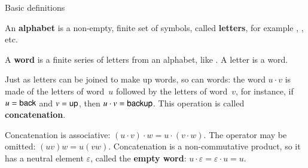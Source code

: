 
%
\begin{frame}{Basic definitions}

An \textbf{alphabet} is a non\hyp{}empty, finite set of symbols, called
\textbf{letters}, for example , ,  etc.

\bigskip

A \textbf{word} is a finite series of letters from an alphabet, like
. A letter is a word.

\bigskip

Just as letters can be joined to make up words, so can words: the word
\(u \cdot v\) is made of the letters of word~\(u\) followed by the
letters of word~\(v\), for instance, if \(u=\textsf{back}\) and
\(v=\textsf{up}\), then \(u \cdot v = \textsf{backup}\). This operation is
called \textbf{concatenation}.

\bigskip

Concatenation is associative: \((u \cdot v) \cdot w = u \cdot (v \cdot
w)\). The operator may be omitted: \((uv)w = u(vw)\). Concatenation is
a non\hyp{}commutative product, so it has a neutral element
\(\varepsilon\), called the \textbf{empty word}: \(u \cdot \varepsilon
= \varepsilon \cdot u = u\).

\end{frame}

